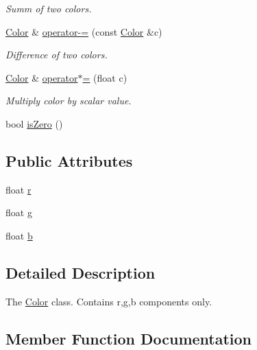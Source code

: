 \begin{DoxyCompactItemize}
\begin{DoxyCompactList}\small\item\em Summ of two colors. \end{DoxyCompactList}\item 
\mbox{\label{class_color_a75c5f84de36f941c9c6471e6423ad6da}} 
\mbox{\hyperlink{class_color}{Color}} \& \mbox{\hyperlink{class_color_a75c5f84de36f941c9c6471e6423ad6da}{operator-\/=}} (const \mbox{\hyperlink{class_color}{Color}} \&c)
\begin{DoxyCompactList}\small\item\em Difference of two colors. \end{DoxyCompactList}\item 
\mbox{\label{class_color_ae1af5e1afd54bde2e229586410d2adc4}} 
\mbox{\hyperlink{class_color}{Color}} \& \mbox{\hyperlink{class_color_ae1af5e1afd54bde2e229586410d2adc4}{operator$\ast$=}} (float c)
\begin{DoxyCompactList}\small\item\em Multiply color by scalar value. \end{DoxyCompactList}\item 
bool \mbox{\hyperlink{class_color_a28a6f5a2125403d7d8ad35f793db21ca}{is\+Zero}} ()
\end{DoxyCompactItemize}
\subsection*{Public Attributes}
\textbf{ }\par
\begin{DoxyCompactItemize}
\item 
float \mbox{\hyperlink{class_color_a3958a556b47d2de3dd45c75aac833c20}{r}}
\item 
float \mbox{\hyperlink{class_color_a5defbb21620e480e556181772d665f34}{g}}
\item 
float \mbox{\hyperlink{class_color_a33e482be18d6ea31d2b403bee13683b7}{b}}
\end{DoxyCompactItemize}



\subsection{Detailed Description}
The \mbox{\hyperlink{class_color}{Color}} class. Contains r,g,b components only. 

\subsection{Member Function Documentation}
\mbox{\label{class_color_a28a6f5a2125403d7d8ad35f793db21ca}} 
